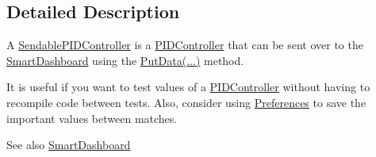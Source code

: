 \subsection{Detailed Description}
A \hyperlink{classSendablePIDController}{SendablePIDController} is a \hyperlink{classPIDController}{PIDController} that can be sent over to the \hyperlink{classSmartDashboard}{SmartDashboard} using the \hyperlink{classSmartDashboard_a3e7cb12569b31c239ed5d5a68f29c2b0}{PutData(...)} method.

It is useful if you want to test values of a \hyperlink{classPIDController}{PIDController} without having to recompile code between tests. Also, consider using \hyperlink{classPreferences}{Preferences} to save the important values between matches.

\begin{DoxySeeAlso}{See also}
\hyperlink{classSmartDashboard}{SmartDashboard} 
\end{DoxySeeAlso}


